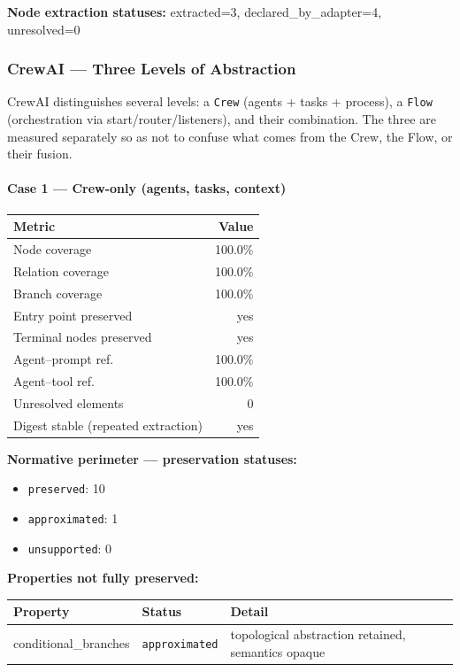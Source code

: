 \documentclass[10pt]{article}
\newcommand{\statuspreserved}{\textcolor{preservedgreen}{\texttt{preserved}}}
\newcommand{\statusapproximated}{\textcolor{approximatedorange}{\texttt{approximated}}}
\newcommand{\statusunsupported}{\textcolor{unsupportedgray}{\texttt{unsupported}}}
\begin{document}
\textbf{Node extraction statuses:} extracted=3, declared\_by\_adapter=4, unresolved=0

\subsubsection{CrewAI --- Three Levels of Abstraction}

CrewAI distinguishes several levels: a \texttt{Crew} (agents + tasks + process), a \texttt{Flow} (orchestration via start/router/listeners), and their combination. The three are measured separately so as not to confuse what comes from the Crew, the Flow, or their fusion.

\paragraph{Case 1 --- Crew-only (agents, tasks, context)}

\begin{table}[htbp]
	\centering
	\begin{tabular}{@{}lr@{}}
		\toprule
		\textbf{Metric} & \textbf{Value} \\
		\midrule
		Node coverage & 100.0\% \\
		Relation coverage & 100.0\% \\
		Branch coverage & 100.0\% \\
		Entry point preserved & yes \\
		Terminal nodes preserved & yes \\
		Agent--prompt ref. & 100.0\% \\
		Agent--tool ref. & 100.0\% \\
		Unresolved elements & 0 \\
		Digest stable (repeated extraction) & yes \\
		\bottomrule
	\end{tabular}
\end{table}

\textbf{Normative perimeter --- preservation statuses:}
\begin{itemize}[nosep]
	\item \statuspreserved{}: 10
	\item \statusapproximated{}: 1
	\item \statusunsupported{}: 0
\end{itemize}

\textbf{Properties not fully preserved:}

\begin{table}[htbp]
	\centering
	\small
	\begin{tabular}{@{}llp{8cm}@{}}
		\toprule
		\textbf{Property} & \textbf{Status} & \textbf{Detail} \\
		\midrule
		conditional\_branches & \statusapproximated{} & topological abstraction retained, semantics opaque \\
		\bottomrule
	\end{tabular}
\end{table}
\end{document}
